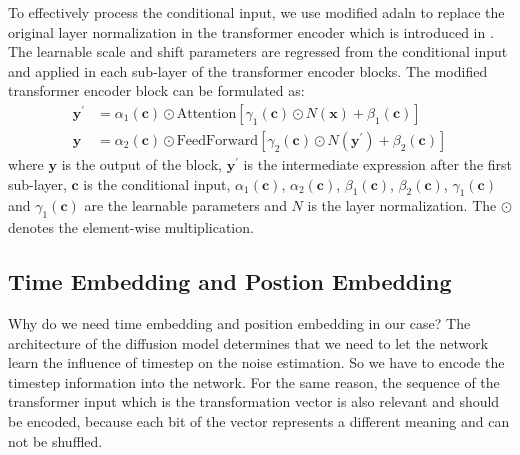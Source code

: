 \documentclass[12pt,DIV14,BCOR12mm,a4paper,footinclude=false,headinclude,parskip=half-,twoside,openright,cleardoublepage=empty,toc=index,bibliography=totoc,listof=totoc]{scrreprt}
\numberwithin{equation}{chapter}
\begin{document}
To effectively process the conditional input, we use modified \gls{adaln} to replace the original layer normalization in the transformer encoder which is introduced in \cite{perez2017film,Peebles2022DiT}. The learnable scale and shift parameters are regressed from the conditional input and applied in each sub-layer of the transformer encoder blocks. The modified transformer encoder block can be formulated as:
\begin{align}
  \mathbf{y}^{'} &= \alpha_{1}(\mathbf{c})\odot {\text{Attention}[\gamma_{1}(\mathbf{c})\odot N(\mathbf{x}) + \beta_{1}(\mathbf{c})]}\\
  \mathbf{y} &= \alpha_{2}(\mathbf{c})\odot {\text{FeedForward}[\gamma_{2}(\mathbf{c})\odot N(\mathbf{y}^{'}) + \beta_{2}(\mathbf{c})]}
\end{align}
where $\mathbf{y}$ is the output of the block, $\mathbf{y}^{'}$ is the intermediate expression after the first sub-layer,  $\mathbf{c}$ is the conditional input, $\alpha_{1}(\mathbf{c})$, $\alpha_{2}(\mathbf{c})$, $\beta_{1}(\mathbf{c})$, $\beta_{2}(\mathbf{c})$, $\gamma_{1}(\mathbf{c})$ and $\gamma_{1}(\mathbf{c})$ are the learnable parameters and $N$ is the layer normalization. The $\odot$ denotes the element-wise multiplication.

\subsection{Time Embedding and Postion Embedding}
Why do we need time embedding and position embedding in our case? The architecture of the diffusion model determines that we need to let the network learn the influence of timestep on the noise estimation. So we have to encode the timestep information into the network. For the same reason, the sequence of the transformer input which is the transformation vector is also relevant and should be encoded, because each bit of the vector represents a different meaning and can not be shuffled.
\end{document}
